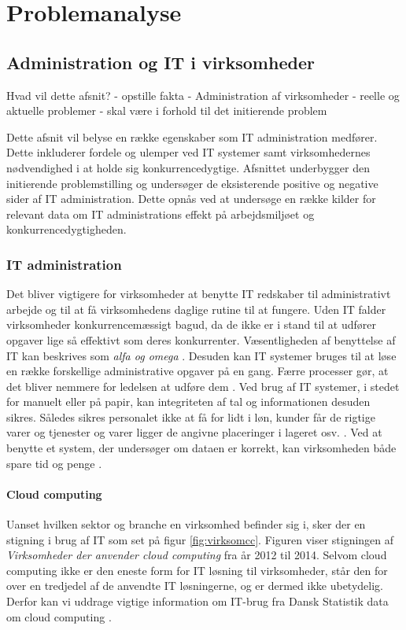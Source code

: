 \chapter{Problemanalyse}\label{ch:analyse}


\section{Administration og IT i virksomheder}
Hvad vil dette afsnit?
- opstille fakta
    - Administration af virksomheder
    - reelle og aktuelle problemer
    - skal være i forhold til det initierende problem

Dette afsnit vil belyse en række egenskaber som IT administration medfører. Dette inkluderer fordele og ulemper ved IT systemer samt virksomhedernes nødvendighed i at holde sig konkurrencedygtige. Afsnittet underbygger den initierende problemstilling og undersøger de eksisterende positive og negative sider af IT administration. Dette opnås ved at undersøge en række kilder for relevant data om IT administrations effekt på arbejdsmiljøet og konkurrencedygtigheden.

\subsection{IT administration}
Det bliver vigtigere for virksomheder at benytte IT redskaber til administrativt arbejde og til at få virksomhedens daglige rutine til at fungere. Uden IT falder virksomheder konkurrencemæssigt bagud, da de ikke er i stand til at udfører opgaver lige så effektivt som deres konkurrenter. Væsentligheden af benyttelse af IT kan beskrives som \textit{alfa og omega} \citep{case_green_team}. Desuden kan IT systemer bruges til at løse en række forskellige administrative opgaver på en gang. Færre processer gør, at det bliver nemmere for ledelsen at udføre dem \citep{Ibiz_streamline}. Ved brug af IT systemer, i stedet for manuelt eller på papir, kan integriteten af tal og informationen desuden sikres. Således sikres personalet ikke at få for lidt i løn, kunder får de rigtige varer og tjenester og varer ligger de angivne placeringer i lageret osv. \citep{Ibiz_streamline}. Ved at benytte et system, der undersøger om dataen er korrekt, kan virksomheden både spare tid og penge \citep{case_green_team}. 

\subsubsection{Cloud computing}
Uanset hvilken sektor og branche en virksomhed befinder sig i, sker der en stigning i brug af IT som set på figur \ref{fig:virksomcc}. Figuren viser stigningen af \textit{Virksomheder der anvender cloud computing} fra år 2012 til 2014. Selvom cloud computing ikke er den eneste form for IT løsning til virksomheder, står den for over en tredjedel af de anvendte IT løsningerne, og er dermed ikke ubetydelig. Derfor kan vi uddrage vigtige information om IT-brug fra Dansk Statistik data om cloud computing \citep{itvirk}.

